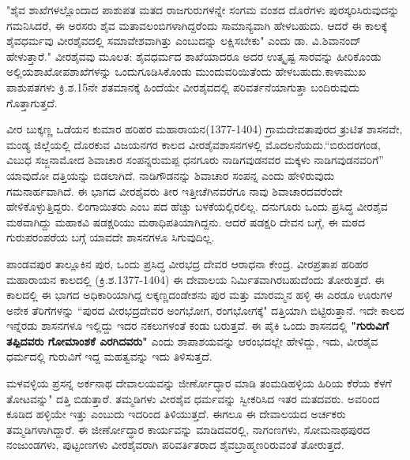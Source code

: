 "ಶೈವ ಶಾಖೆಗಳಲ್ಲೊಂದಾದ ಪಾಶುಪತ ಮತದ ರಾಜಗುರುಗಳನ್ನೇ ಸಂಗಮ ವಂಶದ ದೊರೆಗಳು ಪುರಸ್ಕರಿಸಿರುವು\-ದನ್ನು ಗಮನಿಸಿದರೆ, ಈ ಅರಸರು ಶೈವ ಮತಾವಲಂಬಿಗಳಾಗಿದ್ದರೆಂದು ಸಾಮಾನ್ಯವಾಗಿ ಹೇಳಬಹುದು. ಆದರೆ ಈ ಕಾಲಕ್ಕೆ ಶೈವಧರ್ಮವು ವೀರಶೈವದಲ್ಲಿ ಸಮಾವೇಶವಾಗಿತ್ತು ಎಂಬುದನ್ನು ಲಕ್ಷಿಸಬೇಕು" ಎಂದು ಡಾ. ವಿ.ಶಿವಾನಂದ್​ ಹೇಳುತ್ತಾರೆ." ವೀರಶೈವವು ಮೂಲತ: ಶೈವಧರ್ಮದ ಶಾಖೆಯಾದರೂ ಅದರ ಉತ್ಕೃಷ್ಟ ಸಾರವನ್ನು ಹೀರಿಕೊಂಡು ಅಲ್ಲಿಯ\break ಶಾಖೋಪಶಾಖೆಗಳನ್ನು ಒಂದುಗೂಡಿಸಿಕೊಂಡು ಮುಂದುವರಿಯಿತೆಂದು ಹೇಳಬಹುದು.ಕಾಳಾಮುಖ ಪಾಶುಪತಗಳು ಕ್ರಿ.ಶ.15ನೇ ಶತಮಾನಕ್ಕೆ ಹಿಂದೆಯೇ ವೀರಶೈವದಲ್ಲಿ ಪರಿವರ್ತನೆಯಾಗುತ್ತಾ ಬಂದಿರುವುದು ಗೊತ್ತಾಗುತ್ತದೆ.

ವೀರ ಬುಕ್ಕಣ್ಣ ಒಡೆಯನ ಕುಮಾರ ಹರಿಹರ ಮಹಾರಾಯನ(1377-1404) ಗ್ರಾಮದೇವತಾಪುರದ ತ್ರುಟಿತ ಶಾಸನವೇ, ಮಂಡ್ಯ ಜಿಲ್ಲೆಯಲ್ಲಿ ದೊರಕುವ ವಿಜಯನಗರ ಕಾಲದ ವೀರಶೈವಶಾಸನಗಳಲ್ಲಿ ಮೊದಲನೆಯದು.\break “ಬಿರುದರಗಂಡ, ವಿಬುಧ ಸಜ್ಜನಾಮೋದ ಶಿವಾಚಾರ ಸಂಪನ್ನರುಮಪ್ಪ ಧನಗೂರು ನಾಡಿಗವುಡನವರ ಮಕ್ಕಳು ನಾಡಿಗವುಡ\-ನವರಿಗೆ” ಯಾವುದೋ ದತ್ತಿಯನ್ನು ಬಿಡಲಾಗಿದೆ. ನಾಡಿಗೌಡನನ್ನು ಶಿವಾಚಾರ ಸಂಪನ್ನ ಎಂದು ಹೇಳಿರುವುದು ಗಮನಾರ್ಹ\-ವಾಗಿದೆ. ಈ ಭಾಗದ ವೀರಶೈವರು ತೀರ ಇತ್ತೀಚೆಗಿನವರೆಗೂ ನಾವು ಶಿವಾಚಾರದವರೆಂದೇ ಹೇಳಿಕೊಳ್ಳುತ್ತಿದ್ದರು. ಲಿಂಗಾಯಿತರು ಎಂಬ ಪದ ಹೆಚ್ಚು ಬಳಕೆಯಲ್ಲಿರಲಿಲ್ಲ. ದನುಗೂರು ಒಂದು ಪ್ರಸಿದ್ಧ ವೀರಶೈವ ಮಠವಾಗಿದ್ದು ಮಹಾಕವಿ ಷಡಕ್ಷರಿಯು ಮಠಾಧಿಪತಿಯಾಗಿದ್ದನು. ಆದರೆ ಷಡಕ್ಷರಿ ದೇವನ ಬಗ್ಗೆ, ಈ ಮಠದ ಗುರುಪರಂಪರೆಯ ಬಗ್ಗೆ ಯಾವದೇ ಶಾಸನಗಳೂ ಸಿಗುವುದಿಲ್ಲ.

ಪಾಂಡವಪುರ ತಾಲ್ಲೂಕಿನ ಪುರ, ಒಂದು ಪ್ರಸಿದ್ಧ ವೀರಭದ್ರ ದೇವರ ಆರಾಧನಾ ಕೇಂದ್ರ. ವೀರಪ್ರತಾಪ ಹರಿಹರ ಮಹಾರಾಯನ ಕಾಲದಲ್ಲಿ (ಕ್ರಿ.ಶ.1377-1404) ಈ ದೇವಾಲಯ ನಿರ್ಮಿತವಾಗಿರಬಹುದೆಂದು ತೋರುತ್ತದೆ. ಈ ಕಾಲದಲ್ಲಿ ಈ ಭಾಗದ ಅಧಿಕಾರಿಯಾಗಿದ್ದ ಲಕ್ಕಣ್ಣದಂಡೇಶನು ಪುರ ಮತ್ತು ಮಾರಮ್ಮನ ಹಳ್ಳಿ ಈ ಎರಡೂ ಊರುಗಳ ಅನೇಕ ತೆರಿಗೆಗಳನ್ನು “ಪುರದ ವೀರಭದ್ರದೇವರ ಅಂಗಭೋಗ, ರಂಗಭೋಗಕ್ಕೆ" ದತ್ತಿಯಾಗಿ ಬಿಟ್ಟಿರುತ್ತಾನೆ. ಇದೇ ಕಾಲದ ಇನ್ನೆರಡು ಶಾಸನಗಳೂ ಇಲ್ಲಿದ್ದು ಇದರ ನಕಲುಗಳಂತೆ ಕಂಡು ಬರುತ್ತವೆ. ಈ ಪೈಕಿ ಒಂದು ಶಾಸನದಲ್ಲಿ \textbf{"ಗುರುವಿಗೆ ತಪ್ಪಿದವರು ಗೋಮಾಂಶಕೆ ಎರಗಿದವರು"} ಎಂದು ಶಾಪಾಶಯವನ್ನು ಆರಂಭದಲ್ಲೇ ಹೇಳಿದ್ದು, ಇದು, ವೀರಶೈವ ಧರ್ಮದಲ್ಲಿ ಗುರುವಿಗೆ ಇದ್ದ ಮಹತ್ವವನ್ನು ಇದು ತಿಳಿಸುತ್ತದೆ.

ಮಳವಳ್ಳಿಯ ಪ್ರಸನ್ನ ಅರ್ಕನಾಥ ದೇವಾಲಯವನ್ನು ಜೀರ್ಣೋದ್ಧಾರ ಮಾಡಿ ತಂಮಡಿಹಳ್ಳಿಯ ಹಿರಿಯ ಕೆರೆಯ ಕೆಳಗೆ ತೋಟವನ್ನು" ದತ್ತಿ ಬಿಡುತ್ತಾರೆ. ತಮ್ಮಡಿಗಳು ವೀರಶೈವ ಧರ್ಮವನ್ನು ಸ್ವೀಕರಿಸಿದ ಇತರ ಮತದವರು. ಅವರಿಂದ ಕೂಡಿದ ಹಳ್ಳಿಯೇ ಇತ್ತು ಎಂಬುದು ಇದರಿಂದ ತಿಳಿಯುತ್ತದೆ. ಈಗಲೂ ಈ ದೇವಾಲಯದ ಅರ್ಚಕರು ತಮ್ಮಡಿಗಳಾಗಿದ್ದಾರೆ. ಈ ಜೀರ್ಣೋದ್ಧಾರ ಕಾರ್ಯವನ್ನು ಮಾಡಿದವರಲ್ಲಿ, ನಾಗಂಣಗಳು, ಸೋಮನಾಥಪುರದ ನಂಜುಂಡಗಳು, ಪುಟ್ಟಂಣಗಳು ವೀರಶೈವರಾಗಿ ಪರಿವರ್ತಿತರಾದ ಶೈವಬ್ರಾಹ್ಮಣರಿರುವಂತೆ ತೋರುತ್ತದೆ.

